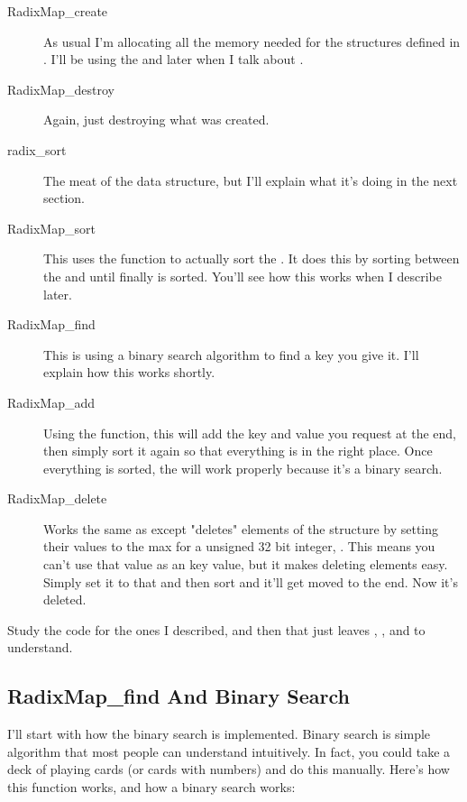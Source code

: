 \begin{description}
\item[RadixMap\_create] As usual I'm allocating all the memory needed for
    the structures defined in .  I'll be using the 
     and  later when I talk about .
\item[RadixMap\_destroy] Again, just destroying what was created.
\item[radix\_sort] The meat of the data structure, but I'll explain what
    it's doing in the next section.
\item[RadixMap\_sort] This uses the  function to actually
    sort the .  It does this by sorting between the 
    and  until finally  is sorted.  You'll see how
    this works when I describe  later.
\item[RadixMap\_find] This is using a binary search algorithm to find a key
    you give it.  I'll explain how this works shortly.
\item[RadixMap\_add] Using the  function, this will
    add the key and value you request at the end, then simply sort it again
    so that everything is in the right place.  Once everything is sorted,
    the  will work properly because it's a binary search.
\item[RadixMap\_delete] Works the same as  except "deletes"
    elements of the structure by setting their values to the max for a unsigned
    32 bit integer, .  This means you can't use that value
    as an key value, but it makes deleting elements easy.  Simply set it to
    that and then sort and it'll get moved to the end.  Now it's deleted.
\end{description}

Study the code for the ones I described, and then that just leaves
, , and 
to understand.

\subsection{RadixMap\_find And Binary Search}

I'll start with how the binary search is implemented.  Binary search is 
simple algorithm that most people can understand intuitively.
In fact, you could take a deck of playing cards (or cards with numbers)
and do this manually.  Here's how this function works, and how a binary
search works:

